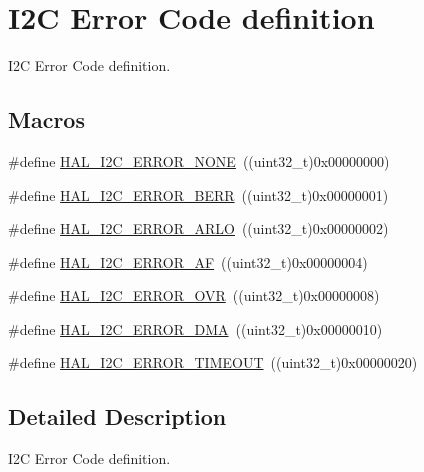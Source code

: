 \hypertarget{group___i2_c___error___code__definition}{\section{I2\-C Error Code definition}
\label{group___i2_c___error___code__definition}
}


I2\-C Error Code definition.  


\subsection*{Macros}
\begin{DoxyCompactItemize}
\item 
\#define \hyperlink{group___i2_c___error___code__definition_ga0b8ca289091d942032c89484b6211d0d}{H\-A\-L\-\_\-\-I2\-C\-\_\-\-E\-R\-R\-O\-R\-\_\-\-N\-O\-N\-E}~((uint32\-\_\-t)0x00000000)
\item 
\#define \hyperlink{group___i2_c___error___code__definition_gab9f6e39431ee764ada50fd63f0ad2fbf}{H\-A\-L\-\_\-\-I2\-C\-\_\-\-E\-R\-R\-O\-R\-\_\-\-B\-E\-R\-R}~((uint32\-\_\-t)0x00000001)
\item 
\#define \hyperlink{group___i2_c___error___code__definition_ga048b36222884bfe80ce2d37fa868690b}{H\-A\-L\-\_\-\-I2\-C\-\_\-\-E\-R\-R\-O\-R\-\_\-\-A\-R\-L\-O}~((uint32\-\_\-t)0x00000002)
\item 
\#define \hyperlink{group___i2_c___error___code__definition_gad1cc236ad6ba5cafe66aecb0dbedc65a}{H\-A\-L\-\_\-\-I2\-C\-\_\-\-E\-R\-R\-O\-R\-\_\-\-A\-F}~((uint32\-\_\-t)0x00000004)
\item 
\#define \hyperlink{group___i2_c___error___code__definition_ga38d8f9beb4c681eba786f6154d4f594a}{H\-A\-L\-\_\-\-I2\-C\-\_\-\-E\-R\-R\-O\-R\-\_\-\-O\-V\-R}~((uint32\-\_\-t)0x00000008)
\item 
\#define \hyperlink{group___i2_c___error___code__definition_gae1091e9e82dcfcfef247b214a11c9db3}{H\-A\-L\-\_\-\-I2\-C\-\_\-\-E\-R\-R\-O\-R\-\_\-\-D\-M\-A}~((uint32\-\_\-t)0x00000010)
\item 
\#define \hyperlink{group___i2_c___error___code__definition_gaeb3bedf36d78ddf3284a68494ab9d089}{H\-A\-L\-\_\-\-I2\-C\-\_\-\-E\-R\-R\-O\-R\-\_\-\-T\-I\-M\-E\-O\-U\-T}~((uint32\-\_\-t)0x00000020)
\end{DoxyCompactItemize}


\subsection{Detailed Description}
I2\-C Error Code definition. 

